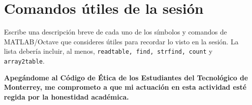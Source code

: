 \documentclass[spanish, 10pt]{article}
\newcommand{\matlab}[1]{\lstinline[style=Matlab-pyglike]!#1!}
\begin{document}
\pagebreak

\section{Comandos útiles de la sesión}

Escribe una descripción breve de cada uno de los símbolos y comandos de MATLAB/Octave que consideres útiles para recordar lo visto en la sesión. La lista debería incluir, al menos, \matlab{readtable, find, strfind, count} y \matlab{array2table}.

\vfill

\textbf{Apegándome al Código de Ética de los Estudiantes del Tecnológico de Monterrey, me comprometo a que mi actuación en esta actividad esté regida por la honestidad académica.}
\end{document}
